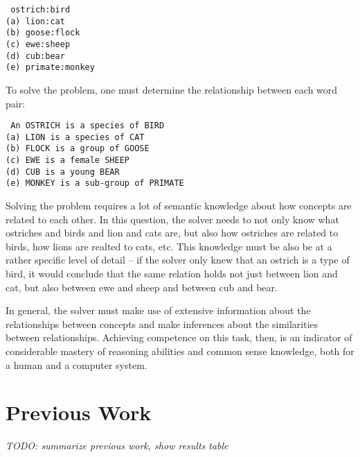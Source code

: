 \documentclass[11pt]{article}
\begin{document}
\texttt{
ostrich:bird\\
(a) lion:cat\\
(b) goose:flock\\
(c) ewe:sheep\\
(d) cub:bear\\
(e) primate:monkey}

To solve the problem, one must determine the relationship between each word pair:

\texttt{
An OSTRICH is a species of BIRD\\
(a) LION is a species of CAT\\
(b) FLOCK is a group of GOOSE\\
(c) EWE is a female SHEEP\\
(d) CUB is a young BEAR\\
(e) MONKEY is a  sub-group of PRIMATE}

Solving the problem requires a lot of semantic knowledge about how concepts are related to each other. In this question, the solver needs to not only know what ostriches and birds and lion and cats are, but also how ostriches are related to birds, how lions are realted to cats, etc. This knowledge must be also be at a rather specific level of detail -- if the solver only knew that an ostrich is a type of bird, it would conclude that the same relation holds not just between lion and cat, but also between ewe and sheep and between cub and bear.

In general, the solver must make use of extensive information about the relationships between concepts and make inferences about the similarities between relationships. Achieving competence on this task, then, is an indicator of considerable mastery of reasoning abilities and common sense knowledge, both for a human and a computer system.

\section{Previous Work}

\textit{TODO: summarize previous work, show results table}
\end{document}
